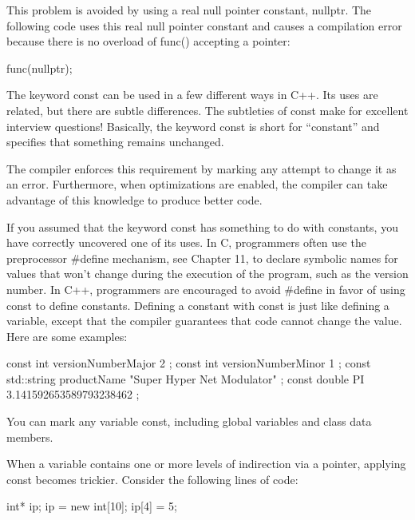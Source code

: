 This problem is avoided by using a real null pointer constant, nullptr. The following code uses this real null pointer constant and causes a compilation error because there is no overload of func() accepting a pointer:

\begin{cpp}
func(nullptr);
\end{cpp}


The keyword const can be used in a few different ways in C++. Its uses are related, but there are subtle differences. The subtleties of const make for excellent interview questions! Basically, the keyword const is short for “constant” and specifies that something remains unchanged.

The compiler enforces this requirement by marking any attempt to change it as an error. Furthermore, when optimizations are enabled, the compiler can take advantage of this knowledge to produce better code.


If you assumed that the keyword const has something to do with constants, you have correctly uncovered one of its uses. In C, programmers often use the preprocessor \#define mechanism, see Chapter 11, to declare symbolic names for values that won’t change during the execution of the program, such as the version number. In C++, programmers are encouraged to avoid \#define in favor of using const to define constants. Defining a constant with const is just like defining a variable, except that the compiler guarantees that code cannot change the value. Here are some examples:

\begin{cpp}
const int versionNumberMajor { 2 };
const int versionNumberMinor { 1 };
const std::string productName { "Super Hyper Net Modulator" };
const double PI { 3.141592653589793238462 };
\end{cpp}

You can mark any variable const, including global variables and class data members.


When a variable contains one or more levels of indirection via a pointer, applying const becomes trickier. Consider the following lines of code:

\begin{cpp}
int* ip;
ip = new int[10];
ip[4] = 5;
\end{cpp}

